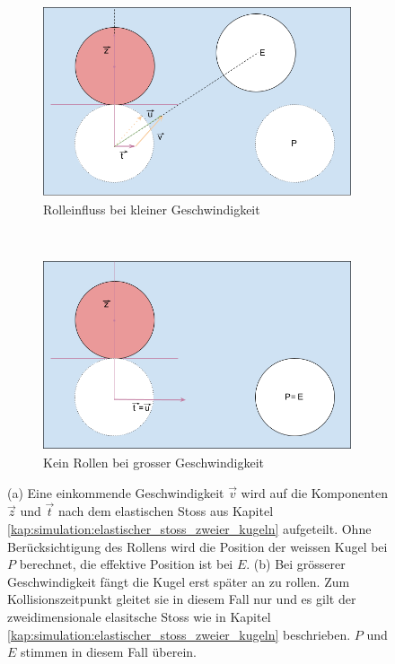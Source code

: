 \begin{figure}[h!]
    \centering
    \begin{subfigure}[b]{0.8\textwidth}
        \includegraphics[width=1\textwidth]{../common/03_billiard_ai/resources/33_rollen_kleine_geschwindigkeit.png}
        \caption{Rolleinfluss bei kleiner Geschwindigkeit}
        \label{fig:rollen_kleine_geschwindigkeit}
    \end{subfigure}\\
    \begin{subfigure}[b]{0.8\textwidth}
        \includegraphics[width=1\textwidth]{../common/03_billiard_ai/resources/34_gleiten_grosse_geschwindigkeit.png}
        \caption{Kein Rollen bei grosser Geschwindigkeit}
        \label{fig:gleiten_grosse_geschwindigkeit}
    \end{subfigure}
    \caption{(a) Eine einkommende Geschwindigkeit $\vec{v}$ wird auf die Komponenten $\vec{z}$ und $\vec{t}$ nach dem
    elastischen Stoss aus Kapitel \ref{kap:simulation:elastischer_stoss_zweier_kugeln} aufgeteilt.
    Ohne Berücksichtigung des Rollens wird die Position der weissen Kugel bei $P$ berechnet, die effektive Position ist bei $E$.
        (b) Bei grösserer Geschwindigkeit fängt die Kugel erst später an zu rollen. Zum Kollisionszeitpunkt gleitet sie
        in diesem Fall nur und es gilt der zweidimensionale elasitsche Stoss wie in
        Kapitel \ref{kap:simulation:elastischer_stoss_zweier_kugeln} beschrieben.
        $P$ und $E$ stimmen in diesem Fall überein.}
    \label{fig:einfluss_rollen}
\end{figure}


